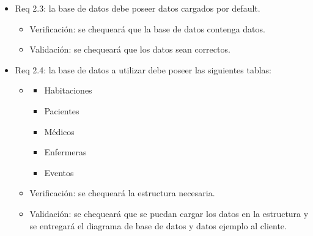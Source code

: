 \documentclass[
11pt, %
]{charter}
\begin{document}
\begin{itemize}
\item Req 2.3: la base de datos debe poseer datos cargados por default.
	\begin{itemize}
	\item Verificación: se chequeará que la base de datos contenga datos.
	\item Validación: se chequeará que los datos sean correctos.
	\end{itemize}
	
\item Req 2.4: la base de datos a utilizar debe poseer las siguientes tablas:
			\begin{itemize}
				\item[]
				\begin{itemize}
					\item Habitaciones
					\item Pacientes			
					\item Médicos
					\item Enfermeras			
					\item Eventos 
				\end{itemize}	
			\end{itemize}	
	\begin{itemize}	
	\item Verificación: se chequeará la estructura necesaria.
	\item Validación: se chequeará que se puedan cargar los datos en la estructura y se entregará el diagrama de base de datos y datos ejemplo al cliente.
	\end{itemize}	


\end{itemize}
\end{document}
